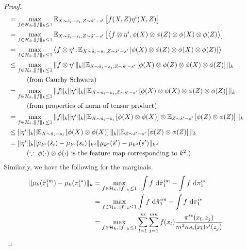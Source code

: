 \begin{proof}
\begin{align*}
    &=\max\limits_{f\in \mathcal{H}_k, \|f\|_k\leq 1} \mathbb{E}_{X\sim \hat{s}_i-s_i, Z\sim \hat{s}'-s'}\left[f(X, Z)\eta^i(X, Z)\right]\\
    & =  \max\limits_{f\in \mathcal{H}_k, \|f\|_k\leq 1} \mathbb{E}_{X\sim \hat{s}_i-s_i, Z\sim \hat{s}'-s'}\left[\left<f\otimes \eta^i, \phi(X)\otimes \phi(Z)\otimes\phi(X)\otimes \phi(Z)\right>\right] \\
    & =  \max\limits_{f\in \mathcal{H}_k, \|f\|_k\leq 1} \left<f\otimes \eta^i, \mathbb{E}_{X\sim \hat{s}_i-s_i, Z\sim \hat{s}'-s'}\left[\phi(X)\otimes \phi(Z)\otimes\phi(X)\otimes \phi(Z)\right]\right> \\
    & \leq  \max\limits_{f\in \mathcal{H}_k, \|f\|_k\leq 1} \|f\otimes \eta^i\|_k\|\mathbb{E}_{X\sim \hat{s}_i-s_i, Z\sim \hat{s}'-s'}\left[\phi(X)\otimes \phi(Z)\otimes\phi(X)\otimes \phi(Z)\right]\|_k \\ &\ \ \tag{from Cauchy Schwarz}\\
    &= \max\limits_{f\in \mathcal{H}_k, \|f\|_k\leq 1} \|f\|_k\|\eta^i\|_k\|\mathbb{E}_{X\sim \hat{s}_i-s_i, Z\sim \hat{s}'-s'}\left[\phi(X)\otimes \phi(X)\otimes\phi(Z)\otimes \phi(Z)\right]\|_k\\
    &\ \ \tag{from properties of norm of tensor product}\\
    &= \max\limits_{f\in \mathcal{H}_k, \|f\|_k\leq 1} \|f\|_k\|\eta^i\|_k\|\mathbb{E}_{X\sim \hat{s}_i-s_i}\left[\phi(X)\otimes \phi(X)\right]\otimes\mathbb{E}_{Z\sim \hat{s}'-s'}\left[\phi(Z)\otimes \phi(Z)\right]\|_k\\
    & \leq \|\eta^i\|_k\|\mathbb{E}_{X\sim \hat{s}_i-s_i}\left[\phi(X)\otimes \phi(X)\right]\|_k\|\mathbb{E}_{Z\sim \hat{s}'-s'}\left[\phi(Z)\otimes \phi(Z)\right]\|_k\\
    & = \|\eta^i\|_k\|\mu_{k^2}(\hat{s}_i)-\mu_{k^2}(s_i)\|_{k^2}\|\mu_{k^2}(\hat{s}')-\mu_{k^2}(s')\|_{k^2}\\
    &\ \ \tag{$\because\ \phi(\cdot)\otimes\phi(\cdot)$ is the feature map corresponding to $k^2$.}
\end{align*}
Similarly, we have the following for the marginals.
\allowdisplaybreaks
\begin{align*}
    \|\mu_k(\hat{\pi}_1^{im})-\mu_k(\pi^{i*}_1)\|_k
    &=\max\limits_{f\in \calH_k, \|f\|_k\leq 1} \Big|\int f~\textup{d}\hat{\pi}_1^{im}-\int f~\textup{d}\pi_1^{i*}\Big| \\
    &=\max\limits_{f\in \calH_k, \|f\|_k\leq 1} \int f~\textup{d}\hat{\pi}_1^{im}-\int f~\textup{d}\pi^{i*}_1
    \\
    &=\max\limits_{f\in \calH_k, \|f\|_k\leq 1} \sum_{l=1}^m\sum_{j=1}^{mn} f(x_l) \frac{\pi^{i*}(x_l, z_j)}{m^2ns_i(x_l)s'(z_j)}\\

\end{align*}
\end{proof}
